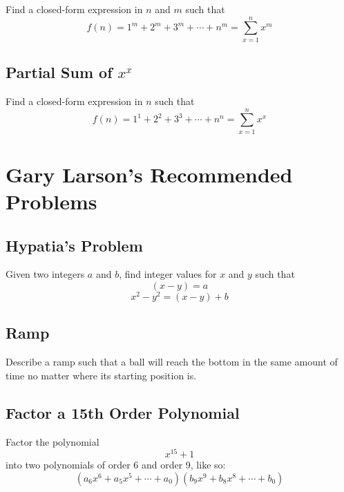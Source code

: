 \documentclass[letterpaper, 11pt]{report}
\numberwithin{equation}{section}
\begin{document}
			
			Find a closed-form expression in $ n $ and $ m $ such that
			\begin{equation}
				f(n) = 1^m + 2^m + 3^m + \cdots + n^m = \sum_{x=1}^{n} x^m
			\end{equation}
			
			
		\section{Partial Sum of $ x^x $}
			
			
			Find a closed-form expression in $ n $ such that
			\begin{equation}
				f(n) = 1^1 + 2^2 + 3^3 + \cdots + n^n = \sum_{x=1}^{n} x^x
			\end{equation}
			
			
			
	
	\chapter{Gary Larson's Recommended Problems}
		
		
		
		\section{Hypatia's Problem}
			
			
			Given two integers \(a\) and \(b\), find integer values for \(x\) and \(y\) such that
			\begin{equation}
				(x-y) = a
			\end{equation}
			\begin{equation}
				x^2 - y^2 = (x-y) + b
			\end{equation}
			
			
		\section{Ramp}
			
			
			Describe a ramp such that a ball will reach the bottom in the same amount of time no matter where its starting position is.
			
			
		\section{Factor a 15th Order Polynomial}
			
			
			Factor the polynomial
			\begin{equation}
				x^{15} + 1
			\end{equation}
			into two polynomials of order 6 and order 9, like so:
			\begin{equation}
				(a_6x^6 + a_5x^5 + \cdots + a_0)(b_9x^9 + b_8x^8 + \cdots + b_0)
			\end{equation}
			
\end{document}
